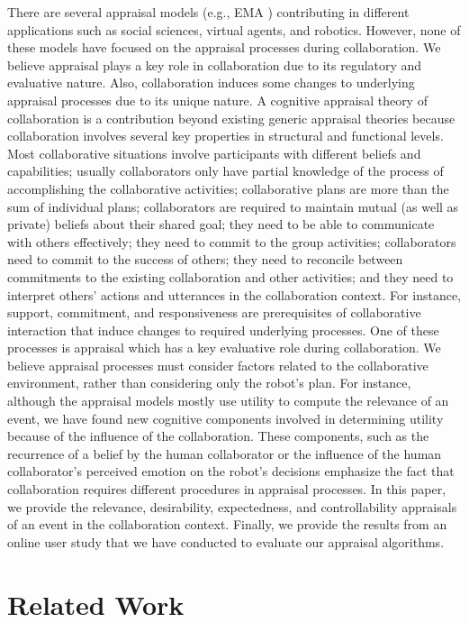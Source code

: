 There are several appraisal models (e.g., EMA \cite{marsella:ema-process-model})
contributing in different applications such as social sciences, virtual agents,
and robotics. However, none of these models have focused on the appraisal
processes during collaboration. We believe appraisal plays a key role in
collaboration due to its regulatory and evaluative nature. Also, collaboration
induces some changes to underlying appraisal processes due to its unique nature.
A cognitive appraisal theory of collaboration is a contribution beyond existing
generic appraisal theories because collaboration involves several key properties
in structural and functional levels. Most collaborative situations involve
participants with different beliefs and capabilities; usually collaborators only
have partial knowledge of the process of accomplishing the collaborative
activities; collaborative plans are more than the sum of individual plans;
collaborators are required to maintain mutual (as well as private) beliefs about
their shared goal; they need to be able to communicate with others
effectively; they need to commit to the group activities; collaborators need
to commit to the success of others; they need to reconcile between commitments
to the existing collaboration and other activities; and they need to interpret
others’ actions and utterances in the collaboration context. For instance,
support, commitment, and responsiveness are prerequisites of collaborative
interaction that induce changes to required underlying processes. One of these
processes is appraisal which has a key evaluative role during collaboration.
We believe appraisal processes must consider factors related to the
collaborative environment, rather than considering only the robot's plan.
For instance, although the appraisal models mostly use utility to compute the
relevance of an event, we have found new cognitive components involved in
determining utility because of the influence of the collaboration. These
components, such as the recurrence of a belief by the human collaborator or the
influence of the human collaborator's perceived emotion on the robot's decisions
emphasize the fact that collaboration requires different procedures in appraisal
processes. In this paper, we provide the relevance, desirability, expectedness,
and controllability appraisals of an event in the collaboration context.
Finally, we provide the results from an online user study that we have conducted
to evaluate our appraisal algorithms.

\section{Related Work}
\label{sec:related-work}

